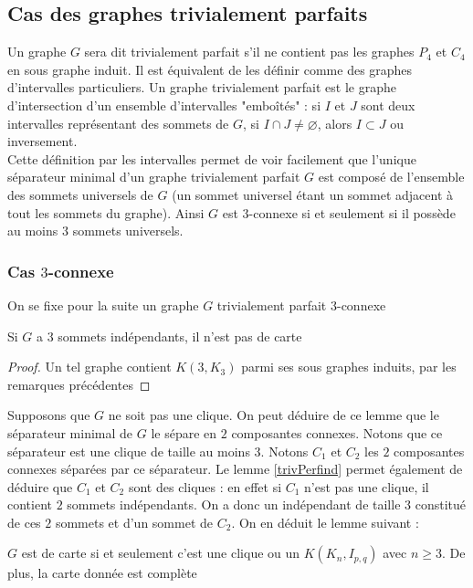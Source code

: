 \documentclass{scrartcl}
\begin{document}
\begin{flushleft}
\subsection{Cas des graphes trivialement parfaits}

Un graphe $G$ sera dit trivialement parfait s'il ne contient pas les graphes $P_4$ et $C_4$ en sous graphe induit.
Il est équivalent de les définir comme des graphes d'intervalles particuliers. Un graphe trivialement parfait est le graphe
d'intersection d'un ensemble d'intervalles "emboîtés" : si $I$ et $J$ sont deux intervalles représentant des sommets de $G$,
si $I \cap J \neq \varnothing$, alors $I \subset J$ ou inversement.\\
Cette définition par les intervalles permet de voir facilement que l'unique séparateur minimal d'un graphe trivialement parfait $G$ est
composé de l'ensemble des sommets universels de $G$ (un sommet universel étant un sommet adjacent à tout les sommets du graphe). Ainsi
$G$ est $3$-connexe si et seulement si il possède au moins $3$ sommets universels.

\subsubsection{Cas $3$-connexe}

On se fixe pour la suite un graphe $G$ trivialement parfait $3$-connexe

\begin{lem}\label{trivPerfind}
    Si $G$ a $3$ sommets indépendants, il n'est pas de carte
\end{lem}

\begin{proof}
    Un tel graphe contient $K(3, K_3)$ parmi ses sous graphes induits, par les remarques précédentes
\end{proof}

Supposons que $G$ ne soit pas une clique.
On peut déduire de ce lemme que le séparateur minimal de $G$ le sépare en $2$ composantes connexes. Notons que ce séparateur est une
clique de taille au moins $3$. Notons $C_1$ et $C_2$ les $2$ composantes connexes séparées par ce séparateur. Le lemme
\ref{trivPerfind} permet également de déduire que $C_1$ et $C_2$ sont des cliques : en effet si $C_1$ n'est pas une clique,
il contient $2$ sommets indépendants. On a donc un indépendant de taille $3$ constitué de ces $2$ sommets et d'un sommet de $C_2$.
On en déduit le lemme suivant :

\begin{lem}\label{trivPar3conn}
    $G$ est de carte si et seulement c'est une clique ou un $K(K_n, I_{p,q})$ avec $n \geq 3$. De plus, la carte
    donnée est complète
\end{lem}


\end{flushleft}
\end{document}
